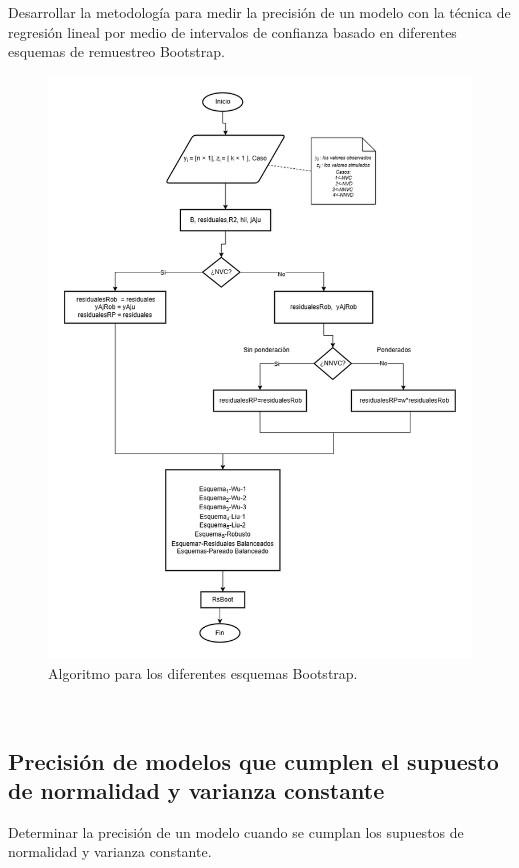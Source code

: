Desarrollar la metodología para medir la precisión de un modelo con la técnica de regresión lineal por medio de intervalos de confianza basado en diferentes esquemas de remuestreo Bootstrap. 
\begin{figure}
	\centering 
	\includegraphics[width=0.70\linewidth]{img/metodo.png} 
	\caption{Algoritmo para los diferentes esquemas Bootstrap.}
\end{figure}
\

































\vspace{1.5cm}
\subsection{Precisión de modelos que cumplen el supuesto de normalidad y varianza constante}
Determinar la precisión de un modelo cuando se cumplan los supuestos de normalidad y varianza constante.
\vspace{1.5cm}





